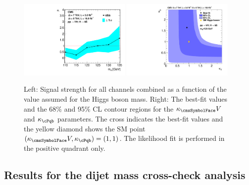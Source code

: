 \documentclass[12pt,twoside,a4paper,cmspaper,final,collab]{cms-tdr}
\begin{document}
\begin{figure}[htbp]
\centering
\includegraphics[width=0.48\textwidth]{PRD_muvalue_Jul20}
\includegraphics[width=0.48\textwidth]{PRD_cv_cf_vhbb}
\caption{Left: Signal strength for all channels combined as a
   function of the value assumed for the Higgs boson mass. Right: The
   best-fit values and the 68\% and 95\% CL contour
regions for the  $\kappa_\Vvar$ and $\kappa_\cPqb$
   parameters. The cross indicates the best-fit
values and the  yellow diamond shows the SM point  $(\kappa_\Vvar,
\kappa_\cPqb) = (1, 1)$. The likelihood fit is performed in the
 positive quadrant only.
}
    \label{fig:mu-values1}
\end{figure}


\subsection{Results for the dijet mass cross-check analysis}
\end{document}
